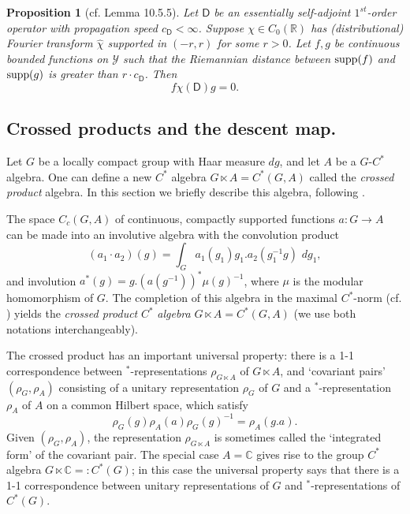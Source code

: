 \documentclass[11pt,reqno]{amsart}
\newtheorem{proposition}[theorem]{Proposition}
\theoremstyle{definition}
\theoremstyle{remark}
\newcommand{\wh}[1]{\widehat{#1}}
\newcommand{\st}[1]{\mathsf{#1}}
\def\Y{\ensuremath{\mathcal{Y}}}
\def\bC{\ensuremath{\mathbb{C}}}
\def\bR{\ensuremath{\mathbb{R}}}
\def\supp{\ensuremath{\textnormal{supp}}}
\begin{document}
\begin{proposition}[cf. \cite{HigsonRoe} Lemma 10.5.5]
\label{PropagationDistance}
Let $\st{D}$ be an essentially self-adjoint $1^{st}$-order operator with propagation speed $c_{\st{D}}<\infty$.  Suppose $\chi \in C_0(\bR)$ has (distributional) Fourier transform $\wh{\chi}$ supported in $(-r,r)$ for some $r>0$.  Let $f,g$ be continuous bounded functions on $\Y$ such that the Riemannian distance between $\supp(f)$ and $\supp(g)$ is greater than $r\cdot c_{\st{D}}$.  Then
\[ f \chi(\st{D})g=0.\]
\end{proposition}

\subsection{Crossed products and the descent map.}\label{sec:CrossProdDescent}
Let $G$ be a locally compact group with Haar measure $dg$, and let $A$ be a $G$-$C^\ast$ algebra.  One can define a new $C^\ast$ algebra $G \ltimes A=C^\ast(G,A)$ called the \emph{crossed product} algebra.  In this section we briefly describe this algebra, following \cite{Blackadar, KasparovNovikov}.

The space $C_c(G,A)$ of continuous, compactly supported functions $a\colon G\rightarrow A$ can be made into an involutive algebra with the convolution product
\[ (a_1\cdot a_2)(g)=\int_G a_1(g_1)g_1.a_2(g_1^{-1}g)\,\,dg_1, \]
and involution $a^\ast(g)=g.(a(g^{-1}))^\ast \mu(g)^{-1}$, where $\mu$ is the modular homomorphism of $G$.  The completion of this algebra in the maximal $C^\ast$-norm (cf. \cite[Section 10]{Blackadar}) yields the \emph{crossed product} $C^\ast$ \emph{algebra} $G \ltimes A=C^\ast(G,A)$ (we use both notations interchangeably).  

The crossed product has an important universal property: there is a 1-1 correspondence between $^\ast$-representations $\rho_{G\ltimes A}$ of $G\ltimes A$, and `covariant pairs' $(\rho_G,\rho_A)$ consisting of a unitary representation $\rho_G$ of $G$ and a $^\ast$-representation $\rho_A$ of $A$ on a common Hilbert space, which satisfy
\[ \rho_G(g)\rho_A(a)\rho_G(g)^{-1}=\rho_A(g.a).\]
Given $(\rho_G,\rho_A)$, the representation $\rho_{G\ltimes A}$ is sometimes called the `integrated form' of the covariant pair.  The special case $A=\bC$ gives rise to the group $C^\ast$ algebra $G\ltimes \bC=:C^\ast(G)$; in this case the universal property says that there is a 1-1 correspondence between unitary representations of $G$ and $^\ast$-representations of $C^\ast(G)$.
\end{document}
